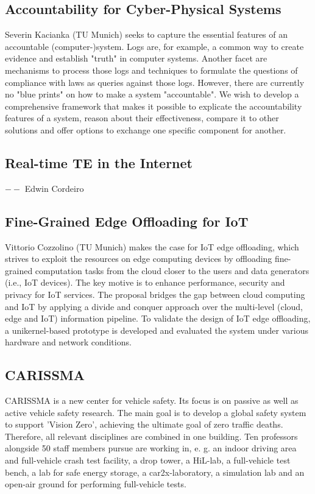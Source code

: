 \subsection{Accountability for Cyber-Physical Systems}

Severin Kacianka (TU Munich) seeks to capture the essential features of an
accountable (computer-)system.  Logs are, for example, a common way to create
evidence and establish  "truth" in computer systems. Another facet are
mechanisms to process those logs and techniques to formulate the questions of
compliance with laws as queries against those logs.  However, there are
currently no "blue prints" on how to make a system "accountable". We wish to
develop a comprehensive framework that makes it possible to explicate the
accountability features of a system, reason about their effectiveness, compare
it to other solutions and offer options to exchange one specific component for
another.


\subsection{Real-time TE in the Internet}
$--$ Edwin Cordeiro

\subsection{Fine-Grained Edge Offloading for IoT}

Vittorio Cozzolino (TU Munich) makes the case for \ac{IoT} edge offloading,
which strives to exploit the resources on edge computing devices by offloading
fine-grained computation tasks from the cloud closer to the users and data
generators (i.e., IoT devices). The key motive is to enhance performance,
security and privacy for IoT services. The proposal bridges the gap between
cloud computing and IoT by applying a divide and conquer approach over the
multi-level (cloud, edge and IoT) information pipeline.  To validate the
design of IoT edge offloading, a unikernel-based prototype is developed and
evaluated the system under various hardware and network conditions.

\subsection{CARISSMA}

\ac{CARISSMA} is a new center for vehicle safety. Its focus is on passive as
well as active vehicle safety research. The main goal is to develop a global
safety system to support 'Vision Zero', achieving the ultimate goal of zero
traffic deaths. Therefore, all relevant disciplines are combined in one
building. Ten professors alongside 50 staff members pursue are working in, e.
g. an indoor driving area and full-vehicle crash test facility, a drop tower,
a HiL-lab, a full-vehicle test bench, a lab for safe energy storage, a
car2x-laboratory, a simulation lab and an open-air ground for performing
full-vehicle tests.

